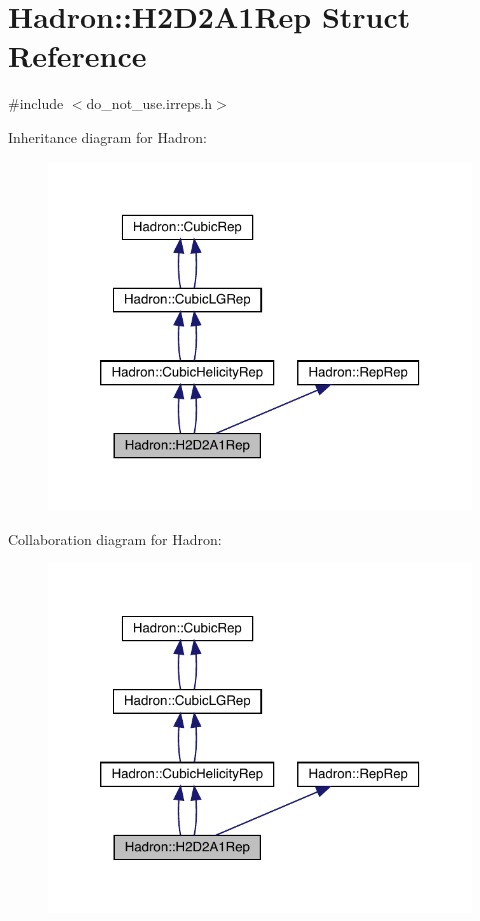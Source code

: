 \hypertarget{structHadron_1_1H2D2A1Rep}{}\section{Hadron\+:\+:H2\+D2\+A1\+Rep Struct Reference}
\label{structHadron_1_1H2D2A1Rep}


{\ttfamily \#include $<$do\+\_\+not\+\_\+use.\+irreps.\+h$>$}



Inheritance diagram for Hadron\+:\nopagebreak
\begin{figure}[H]
\begin{center}
\leavevmode
\includegraphics[width=320pt]{d3/d14/structHadron_1_1H2D2A1Rep__inherit__graph}
\end{center}
\end{figure}


Collaboration diagram for Hadron\+:\nopagebreak
\begin{figure}[H]
\begin{center}
\leavevmode
\includegraphics[width=320pt]{df/da7/structHadron_1_1H2D2A1Rep__coll__graph}
\end{center}
\end{figure}
